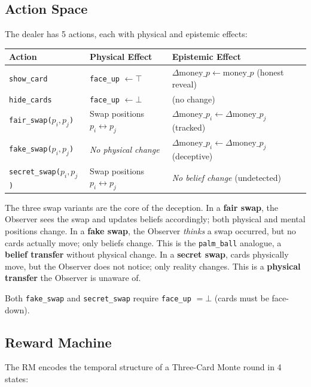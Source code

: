 \documentclass[11pt]{article}
\newcommand{\EBel}[1]{\ensuremath{\Delta #1}} %
\begin{document}
\subsection{Action Space}

The dealer has 5 actions, each with physical and epistemic effects:

\begin{center}
\begin{tabular}{lll}
\toprule
\textbf{Action} & \textbf{Physical Effect} & \textbf{Epistemic Effect} \\
\midrule
\texttt{show\_card} & \texttt{face\_up} $\gets \top$ & $\EBel{\text{money}\_p} \gets \text{money}\_p$ (honest reveal) \\
\texttt{hide\_cards} & \texttt{face\_up} $\gets \bot$ & (no change) \\
\texttt{fair\_swap($p_i, p_j$)} & Swap positions $p_i \leftrightarrow p_j$ & $\EBel{\text{money}\_p_i} \gets \EBel{\text{money}\_p_j}$ (tracked) \\
\texttt{fake\_swap($p_i, p_j$)} & \emph{No physical change} & $\EBel{\text{money}\_p_i} \gets \EBel{\text{money}\_p_j}$ (deceptive) \\
\texttt{secret\_swap($p_i, p_j$)} & Swap positions $p_i \leftrightarrow p_j$ & \emph{No belief change} (undetected) \\
\bottomrule
\end{tabular}
\end{center}

The three swap variants are the core of the deception.
In a \textbf{fair swap}, the Observer sees the swap and updates beliefs accordingly; both physical and mental positions change.
In a \textbf{fake swap}, the Observer \emph{thinks} a swap occurred, but no cards actually move; only beliefs change. This is the \texttt{palm\_ball} analogue, a \textbf{belief transfer} without physical change.
In a \textbf{secret swap}, cards physically move, but the Observer does not notice; only reality changes. This is a \textbf{physical transfer} the Observer is unaware of.

Both \texttt{fake\_swap} and \texttt{secret\_swap} require \texttt{face\_up} $= \bot$ (cards must be face-down).

\subsection{Reward Machine}

The RM encodes the temporal structure of a Three-Card Monte round in 4 states:
\end{document}

